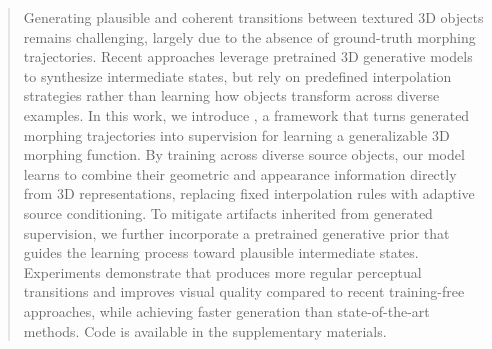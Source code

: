 \begin{abstract}
Generating plausible and coherent transitions between textured 3D objects remains challenging, largely due to the absence of ground-truth morphing trajectories. Recent approaches leverage pretrained 3D generative models to synthesize intermediate states, but rely on predefined interpolation strategies rather than learning how objects transform across diverse examples.
In this work, we introduce \methodname{}, a framework that turns generated morphing trajectories into supervision for learning a generalizable 3D morphing function. By training across diverse source objects, our model learns to combine their geometric and appearance information directly from 3D representations, replacing fixed interpolation rules with adaptive source conditioning. To mitigate artifacts inherited from generated supervision, we further incorporate a pretrained generative prior that guides the learning process toward plausible intermediate states. Experiments demonstrate that \methodname{} produces more regular perceptual transitions and improves visual quality compared to recent training-free approaches, while achieving faster generation than state-of-the-art methods. Code is available in the supplementary materials.
\end{abstract}